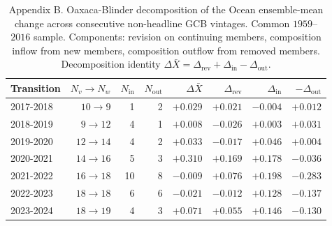 \begin{table}[h]
  \centering
  \caption{Appendix B. Oaxaca-Blinder decomposition of the Ocean ensemble-mean change across consecutive non-headline GCB vintages. Common $1959$--$2016$ sample. Components: revision on continuing members, composition inflow from new members, composition outflow from removed members. Decomposition identity $\Delta \bar X = \Delta_{\mathrm{rev}} + \Delta_{\mathrm{in}} - \Delta_{\mathrm{out}}$.}
  \label{tab:appB_ocean}
  \begin{tabular}{lrrrrrrr}
    \toprule
    Transition & $N_v\!\to\! N_w$ & $N_{\mathrm{in}}$ & $N_{\mathrm{out}}$ & $\Delta \bar X$ & $\Delta_{\mathrm{rev}}$ & $\Delta_{\mathrm{in}}$ & $-\Delta_{\mathrm{out}}$ \\
    \midrule
    2017-2018 & $10\!\to\!9$ & 1 & 2 & $+0.029$ & $+0.021$ & $-0.004$ & $+0.012$ \\
    2018-2019 & $9\!\to\!12$ & 4 & 1 & $+0.008$ & $-0.026$ & $+0.003$ & $+0.031$ \\
    2019-2020 & $12\!\to\!14$ & 4 & 2 & $+0.033$ & $-0.017$ & $+0.046$ & $+0.004$ \\
    2020-2021 & $14\!\to\!16$ & 5 & 3 & $+0.310$ & $+0.169$ & $+0.178$ & $-0.036$ \\
    2021-2022 & $16\!\to\!18$ & 10 & 8 & $-0.009$ & $+0.076$ & $+0.198$ & $-0.283$ \\
    2022-2023 & $18\!\to\!18$ & 6 & 6 & $-0.021$ & $-0.012$ & $+0.128$ & $-0.137$ \\
    2023-2024 & $18\!\to\!19$ & 4 & 3 & $+0.071$ & $+0.055$ & $+0.146$ & $-0.130$ \\
    \bottomrule
  \end{tabular}
\end{table}

